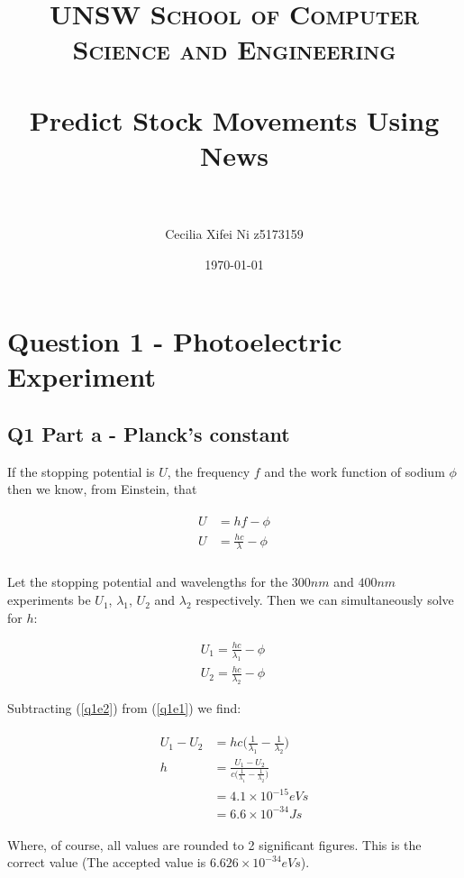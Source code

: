 \documentclass[paper=a4, fontsize=12pt]{scrartcl}
\title{	\normalfont \normalsize
\textsc{UNSW School of Computer Science and Engineering} \\ [24pt]
\horrule{1pt} \\[0.5cm] %
\LARGE Predict Stock Movements Using News \\ %
\horrule{1pt} \\[0.5cm] %
}
\author{Cecilia Xifei Ni z5173159} %
\date{\normalsize\today} %
\begin{document}
\thispagestyle{empty}

\maketitle %

\section{Question 1 - Photoelectric Experiment}

\subsection{Q1 Part a - Planck's constant}

If the stopping potential is $U$, the frequency $f$ and the work function of sodium $\phi$ then we know, from Einstein, that

\begin{align*}
\begin{split}
U &= hf - \phi\\
U &= \frac{hc}{\lambda} - \phi\\
\end{split}
\end{align*}

Let the stopping potential and wavelengths for the $300nm$ and $400nm$ experiments be $U_1$, $\lambda_1$, $U_2$ and $\lambda_2$ respectively. Then we can simultaneously solve for $h$:

\begin{align}
U_1 = \frac{hc}{\lambda_1} - \phi ~\label{q1e1}\\
U_2 = \frac{hc}{\lambda_2} - \phi ~\label{q1e2}
\end{align}

\clearpage

Subtracting (\ref{q1e2}) from (\ref{q1e1}) we find:

\begin{align*}
\begin{split}
U_1 - U_2 &= hc \Big( \frac{1}{\lambda_1} - \frac{1}{\lambda_2} \Big)\\
h &= \frac{U_1 - U_2}{c \Big( \frac{1}{\lambda_1} - \frac{1}{\lambda_2} \Big)}\\
&= 4.1 \times 10^{-15} eV s\\
&= 6.6 \times 10^{-34} J s
\end{split}
\end{align*}

Where, of course, all values are rounded to 2 significant figures. This is the correct value (The accepted value is $6.626 \times 10^{-34} eV s$).
\end{document}

